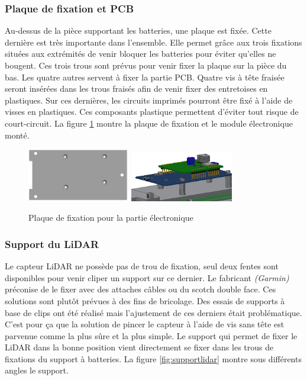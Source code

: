 \subsubsection{Plaque de fixation et PCB}

Au-dessus de la pièce supportant les batteries, une plaque est fixée. Cette dernière est très importante 
dans l’ensemble. Elle permet grâce aux trois fixations situées aux extrémités de venir bloquer les batteries 
pour éviter qu'elles ne bougent. Ces trois trous sont prévus pour venir fixer la plaque 
sur la pièce du bas. Les quatre autres servent à fixer la partie PCB. Quatre vis à tête fraisée seront 
insérées dans les trous fraisés afin de venir fixer des entretoises en plastiques. Sur ces dernières, 
les circuits imprimés pourront être fixé à l’aide de visses en plastiques. Ces composants 
plastique permettent d’éviter tout risque de court-circuit. La figure \ref{fig:fixelectronique} montre la plaque
de fixation et le module électronique monté.

\begin{figure}[H]
    \centering
    \includegraphics[width=0.4\textwidth]{Images/photos_PGA/plaquesmodule.PNG}
    \includegraphics[width=0.4\textwidth]{Images/photos_PGA/PCB.PNG}
    \caption{Plaque de fixation pour la partie électronique}
    \label{fig:fixelectronique}
\end{figure}

\subsubsection{Support du LiDAR}

Le capteur LiDAR ne possède pas de trou de fixation, seul deux fentes sont disponibles pour venir 
cliper un support sur ce dernier. Le fabricant \emph{(Garmin)} préconise de le fixer avec des attaches câbles ou du scotch 
double face. Ces solutions sont plutôt prévues à des fins de bricolage. Des essais de supports à base 
de clips ont été réalisé mais l’ajustement de ces derniers était problématique. C’est pour ça que la 
solution de pincer le capteur à l’aide de vis sans tête est parvenue comme la plus sûre et la plus simple. 
Le support qui permet de fixer le LiDAR dans la bonne position vient directement se fixer dans les 
trous de fixations du support à batteries. La figure \ref{fig:supportlidar} montre sous différents angles 
le support.

